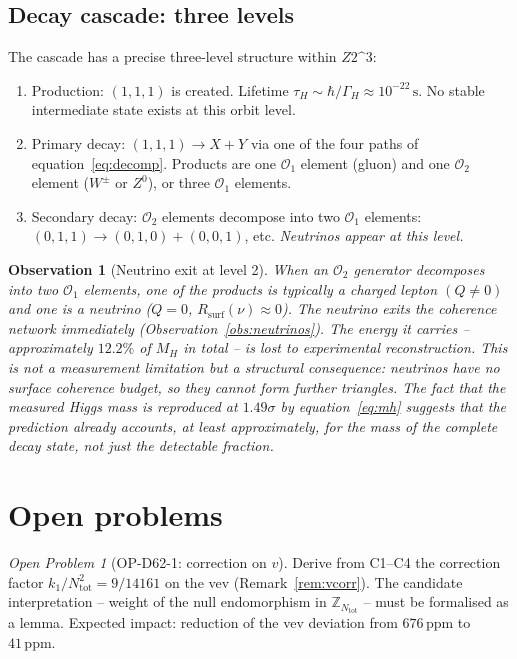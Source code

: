 \documentclass[12pt,a4paper]{article}
\newtheorem{observation}[theorem]{Observation}
\theoremstyle{remark}
\newtheorem{openproblem}[theorem]{Open Problem}
\newcommand{\Ztwo}{\mathbb{Z}_{2}^{3}}
\newcommand{\Ntot}{N_{\mathrm{tot}}}
\newcommand{\ppm}{\,\mathrm{ppm}}
\def\Ztwo{Z2\^{}3}%
\begin{document}
\subsection{Decay cascade: three levels}

The cascade has a precise three-level structure within $\Ztwo$:
\begin{enumerate}
\item[\textbf{Level 0.}] Production: $(1,1,1)$ is created. Lifetime
$\tau_{H}\sim\hbar/\Gamma_{H}\approx10^{-22}\,\mathrm{s}$. No stable
intermediate state exists at this orbit level.
\item[\textbf{Level 1.}] Primary decay: $(1,1,1)\to X+Y$ via one of the four
paths of equation~\eqref{eq:decomp}. Products are one $\mathcal{O}_{1}$
element (gluon) and one $\mathcal{O}_{2}$ element ($W^{\pm}$ or $Z^{0}$),
or three $\mathcal{O}_{1}$ elements.
\item[\textbf{Level 2.}] Secondary decay: $\mathcal{O}_{2}$ elements decompose
into two $\mathcal{O}_{1}$ elements: $(0,1,1)\to(0,1,0)+(0,0,1)$, etc.
\emph{Neutrinos appear at this level.}
\end{enumerate}

\begin{observation}[Neutrino exit at level 2]\label{obs:nu-level}
When an $\mathcal{O}_{2}$ generator decomposes into two $\mathcal{O}_{1}$
elements, one of the products is typically a charged lepton $(Q\neq0)$ and
one is a neutrino ($Q=0$, $R_{\mathrm{surf}}(\nu)\approx0$). The neutrino
exits the coherence network immediately (Observation~\ref{obs:neutrinos}).
The energy it carries -- approximately $12.2\%$ of $M_{H}$ in total -- is
lost to experimental reconstruction. This is not a measurement limitation but
a structural consequence: neutrinos have no surface coherence budget, so they
cannot form further triangles. The fact that the measured Higgs mass is
reproduced at $1.49\sigma$ by equation~\eqref{eq:mh} suggests that the
prediction already accounts, at least approximately, for the mass of the
complete decay state, not just the detectable fraction.
\end{observation}

\section{Open problems}

\begin{openproblem}[OP-D62-1: correction on $v$]\label{op:1}
Derive from C1--C4 the correction factor $k_{1}/\Ntot^{2}=9/14161$ on the vev
(Remark~\ref{rem:vcorr}). The candidate interpretation -- weight of the null
endomorphism in $\mathbb{Z}_{\Ntot}$ -- must be formalised as a lemma. Expected
impact: reduction of the vev deviation from $676\ppm$ to $41\ppm$.
\end{openproblem}
\end{document}
